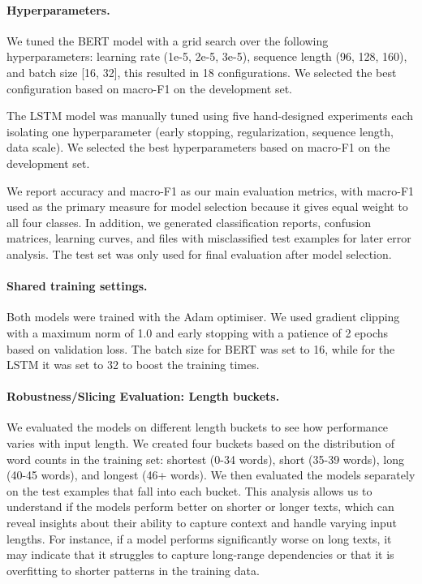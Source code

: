 

\paragraph{Hyperparameters.}

We tuned the BERT model with a grid search over the following hyperparameters: learning rate (1e-5, 2e-5, 3e-5), sequence length (96, 128, 160), and batch size [16, 32], this resulted in 18 configurations. We selected the best configuration based on macro-F1 on the development set.

The LSTM model was manually tuned using five hand-designed experiments each isolating one hyperparameter (early stopping, regularization, sequence length, data scale). We selected the best hyperparameters based on macro-F1 on the development set.

We report accuracy and macro-F1 as our main evaluation metrics, with macro-F1 used as the primary measure for model selection because it gives equal weight to all four classes. In addition, we generated classification reports, confusion matrices, learning curves, and files with misclassified test examples for later error analysis. The test set was only used for final evaluation after model selection.

\paragraph{Shared training settings.}
Both models were trained with the Adam optimiser. We used gradient clipping with a maximum norm of 1.0 and early stopping with a patience of 2 epochs based on validation loss. The batch size for BERT was set to 16, while for the LSTM it was set to 32 to boost the training times.

\paragraph{Robustness/Slicing Evaluation: Length buckets.}
We evaluated the models on different length buckets to see how performance varies with input length. We created four buckets based on the distribution of word counts in the training set: shortest (0-34 words), short (35-39 words), long (40-45 words), and longest (46+ words). We then evaluated the models separately on the test examples that fall into each bucket. This analysis allows us to understand if the models perform better on shorter or longer texts, which can reveal insights about their ability to capture context and handle varying input lengths. For instance, if a model performs significantly worse on long texts, it may indicate that it struggles to capture long-range dependencies or that it is overfitting to shorter patterns in the training data.

